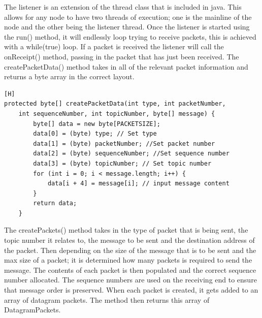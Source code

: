 \documentclass{article}
\begin{document}
The listener is an extension of the thread class that is included in java. This allows for any node to have two threads of execution; one is the mainline of the node and the other being the listener thread. Once the listener is started using the run() method, it will endlessly loop trying to receive packets, this is achieved with a while(true) loop. If a packet is received the listener will call the onReceipt() method, passing in the packet that has just been received. 
\newline
\newline
The createPacketData() method takes in all of the relevant packet information and returns a byte array in the correct layout.

\begin{lstlisting}[caption={[Sample Code 2]The code above shows the way in which a packet is made}, label={lst:node}][H]
protected byte[] createPacketData(int type, int packetNumber,
 	int sequenceNumber, int topicNumber, byte[] message) {
		byte[] data = new byte[PACKETSIZE];
		data[0] = (byte) type; // Set type
		data[1] = (byte) packetNumber; //Set packet number
		data[2] = (byte) sequenceNumber; //Set sequence number
		data[3] = (byte) topicNumber; // Set topic number
		for (int i = 0; i < message.length; i++) {
			data[i + 4] = message[i]; // input message content
		}
		return data;
	}
\end{lstlisting}

The createPackets() method takes in the type of packet that is being sent, the topic number it relates to, the message to be sent and the destination address of the packet. Then depending on the size of the message that is to be sent and the max size of a packet; it is determined how many packets is required to send the message. The contents of each packet is then populated and the correct sequence number allocated. The sequence numbers are used on the receiving end to ensure that message order is preserved. When each packet is created, it gets added to an array of datagram packets. The method then returns this array of DatagramPackets.
\end{document}
